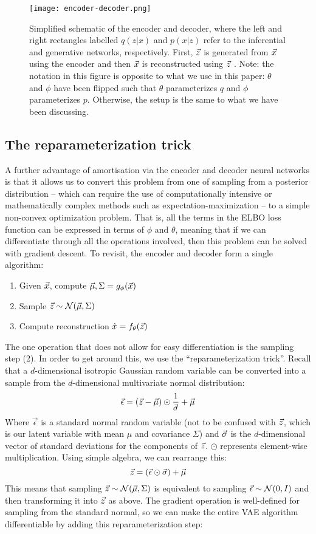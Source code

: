 \begin{figure}[h]
    \texttt{[image: encoder-decoder.png]}
    \caption{Simplified schematic of the encoder and decoder, where the left and right rectangles labelled $q(z|x)$ and $p(x|z)$ refer to the inferential and generative networks, respectively. First, $\vec{z}$ is generated from $\vec{x}$ using the encoder and then $\vec{x}$ is reconstructed using $\vec{z}$ \cite{jaanTutorial}. Note: the notation in this figure is opposite to what we use in this paper: $\theta$ and $\phi$ have been flipped such that $\theta$ parameterizes $q$ and $\phi$ parameterizes $p$. Otherwise, the setup is the same to what we have been discussing.}
    \label{fig:encoder-decoder}
\end{figure}

\subsection{The reparameterization trick}

A further advantage of amortisation via the encoder and decoder neural networks is that it allows us to convert this problem from one of sampling from a posterior distribution -- which can require the use of computationally intensive or mathematically complex methods such as expectation-maximization -- to a simple non-convex optimization problem. That is, all the terms in the ELBO loss function can be expressed in terms of $\phi$ and $\theta$, meaning that if we can differentiate through all the operations involved, then this problem can be solved with gradient descent. To revisit, the encoder and decoder form a single algorithm:
\begin{enumerate}
    \item Given $\vec{x}$, compute $\vec{\mu}, \Sigma = g_\phi(\vec{x})$
    \item Sample $\vec{z}\sim\mathcal{N}(\vec{\mu},\Sigma)$
    \item Compute reconstruction $\hat{x} = f_\theta(\vec{z})$
\end{enumerate}

The one operation that does not allow for easy differentiation is the sampling step (2). In order to get around this, we use the ``reparameterization trick''. Recall that a $d$-dimensional isotropic Gaussian random variable can be converted into a sample from the $d$-dimensional multivariate normal distribution:
\[
    \vec{\epsilon} = (\vec{z} - \vec{\mu}) \odot \frac{1}{\vec{\sigma}} + \vec{\mu}
\]
Where $\vec{\epsilon}$ is a standard normal random variable (not to be confused with $\vec{z}$, which is our latent variable with mean $\mu$ and covariance $\Sigma$) and $\vec{\sigma}$ is the $d$-dimensional vector of standard deviations for the components of $\vec{z}$. $\odot$ represents element-wise multiplication. Using simple algebra, we can rearrange this:
\[
    \vec{z} = (\vec{\epsilon} \odot \vec{\sigma}) + \vec{\mu}
\]
This means that sampling $\vec{z}\sim\mathcal{N}(\vec{\mu},\Sigma)$ is equivalent to sampling $\vec{\epsilon}\sim\mathcal{N}(0,I)$ and then transforming it into $\vec{z}$ as above. The gradient operation is well-defined for sampling from the standard normal, so we can make the entire VAE algorithm differentiable by adding this reparameterization step:

